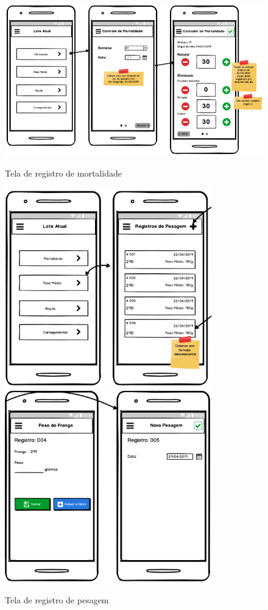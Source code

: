 \begin{apendicesenv}
\begin{figure}[h]
    \centering
    \caption{Tela de registro de mortalidade}
    \includegraphics[width=1.0\textwidth]{./dados/figuras/p4.png}
    \label{fig:p4}
\end{figure}

\begin{figure}[h]
    \centering
    \caption{Tela de registro de pesagem}
    \includegraphics[width=0.8\textwidth]{./dados/figuras/p5.png}
    \includegraphics[width=0.8\textwidth]{./dados/figuras/p5_1.png}
    \label{fig:p5}
\end{figure}


\end{apendicesenv}
